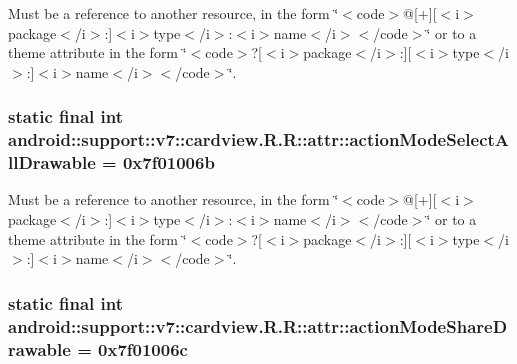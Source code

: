 Must be a reference to another resource, in the form \char`\"{}$<$code$>$@\mbox{[}+\mbox{]}\mbox{[}$<$i$>$package$<$/i$>$:\mbox{]}$<$i$>$type$<$/i$>$:$<$i$>$name$<$/i$>$$<$/code$>$\char`\"{} or to a theme attribute in the form \char`\"{}$<$code$>$?\mbox{[}$<$i$>$package$<$/i$>$:\mbox{]}\mbox{[}$<$i$>$type$<$/i$>$:\mbox{]}$<$i$>$name$<$/i$>$$<$/code$>$\char`\"{}. \hypertarget{classandroid_1_1support_1_1v7_1_1cardview_1_1_r_1_1attr_a27d3d7676fd12cf993504b23d31ad2e}{
\subsubsection[{actionModeSelectAllDrawable}]{\setlength{\rightskip}{0pt plus 5cm}static final int android::support::v7::cardview.R.R::attr::actionModeSelectAllDrawable = 0x7f01006b}}
\label{classandroid_1_1support_1_1v7_1_1cardview_1_1_r_1_1attr_a27d3d7676fd12cf993504b23d31ad2e}


Must be a reference to another resource, in the form \char`\"{}$<$code$>$@\mbox{[}+\mbox{]}\mbox{[}$<$i$>$package$<$/i$>$:\mbox{]}$<$i$>$type$<$/i$>$:$<$i$>$name$<$/i$>$$<$/code$>$\char`\"{} or to a theme attribute in the form \char`\"{}$<$code$>$?\mbox{[}$<$i$>$package$<$/i$>$:\mbox{]}\mbox{[}$<$i$>$type$<$/i$>$:\mbox{]}$<$i$>$name$<$/i$>$$<$/code$>$\char`\"{}. \hypertarget{classandroid_1_1support_1_1v7_1_1cardview_1_1_r_1_1attr_001b0538703178fae0447facea899e79}{
\subsubsection[{actionModeShareDrawable}]{\setlength{\rightskip}{0pt plus 5cm}static final int android::support::v7::cardview.R.R::attr::actionModeShareDrawable = 0x7f01006c}}
\label{classandroid_1_1support_1_1v7_1_1cardview_1_1_r_1_1attr_001b0538703178fae0447facea899e79}


